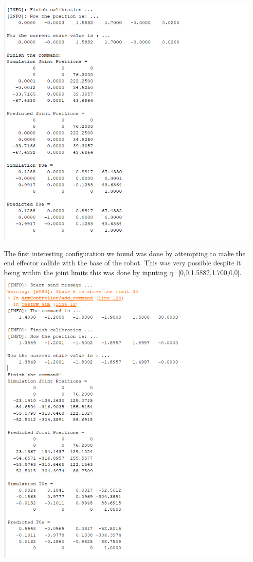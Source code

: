 \documentclass[12pt]{article}
\begin{document}
\includegraphics[scale=1]{firstweird config}
\par{
The first interesting configuration we found was done by attempting to make the end effector collide with the base of the robot. This was very possible despite it being within the joint limits this was done by inputing  q=[0,0,1.5882,1.700,0,0].  
}  
\includegraphics[scale=1]{entering the joint limits of every joint}
\end{document}
